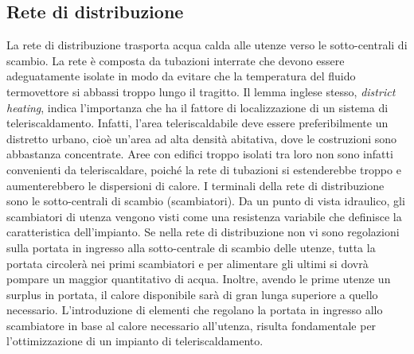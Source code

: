 \documentclass[laurea,oneside,11pt]{USiena_tesiLM}
\begin{document}
%
%
%
%

\subsection{Rete di distribuzione}
La rete di distribuzione trasporta acqua calda alle utenze verso le sotto-centrali di scambio. La rete è composta da tubazioni interrate che  devono  essere adeguatamente isolate  in  modo  da  evitare  che  la temperatura  del fluido termovettore si abbassi troppo lungo il tragitto. 
Il  lemma  inglese  stesso,  \textit{district  heating},  indica  l'importanza  che  ha  il  fattore  di localizzazione  di un sistema  di  teleriscaldamento. Infatti,  l'area  teleriscaldabile  deve  essere  preferibilmente  un distretto  urbano,  cioè  un'area  ad  alta  densità  abitativa,  dove  le  costruzioni  sono abbastanza concentrate.
Aree  con  edifici  troppo  isolati  tra  loro  non  sono  infatti  convenienti  da  teleriscaldare, poiché
la rete di tubazioni si estenderebbe troppo e aumenterebbero le dispersioni di calore.
I terminali della rete di distribuzione sono le sotto-centrali di scambio (scambiatori). Da un punto di vista idraulico, gli scambiatori di utenza vengono visti come una resistenza variabile che definisce la caratteristica dell'impianto. 
Se nella rete di distribuzione non vi sono regolazioni sulla portata in ingresso alla sotto-centrale di scambio delle utenze, tutta la portata circolerà nei primi scambiatori e per alimentare gli ultimi si dovrà pompare un maggior quantitativo di acqua. Inoltre, avendo le prime utenze un surplus in portata, il calore disponibile sarà di gran lunga superiore a quello necessario. 
L'introduzione di elementi che regolano la portata in ingresso allo scambiatore in base al calore necessario all'utenza, risulta fondamentale per l'ottimizzazione di un impianto di teleriscaldamento. 
\end{document}

